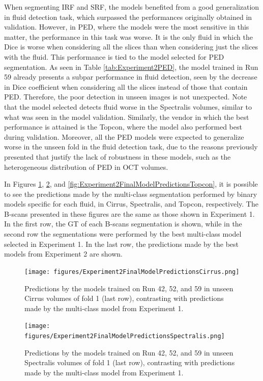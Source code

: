 When segmenting IRF and SRF, the models benefited from a good generalization in fluid detection task, which surpassed the performances originally obtained in validation. However, in PED, where the models were the most sensitive in this matter, the performance in this task was worse. It is the only fluid in which the Dice is worse when considering all the slices than when considering just the slices with the fluid. This performance is tied to the model selected for PED segmentation. As seen in Table \ref{tab:Experiment2PED}, the model trained in Run 59 already presents a subpar performance in fluid detection, seen by the decrease in Dice coefficient when considering all the slices instead of those that contain PED. Therefore, the poor detection in unseen images is not unexpected. Note that the model selected detects fluid worse in the Spectralis volumes, similar to what was seen in the model validation. Similarly, the vendor in which the best performance is attained is the Topcon, where the model also performed best during validation. Moreover, all the PED models were expected to generalize worse in the unseen fold in the fluid detection task, due to the reasons previously presented that justify the lack of robustness in these models, such as the heterogeneous distribution of PED in OCT volumes.
\par
In Figures \ref{fig:Experiment2FinalModelPredictionsCirrus}, \ref{fig:Experiment2FinalModelPredictionsSpectralis}, and \ref{fig:Experiment2FinalModelPredictionsTopcon}, it is possible to see the predictions made by the multi-class segmentation performed by binary models specific for each fluid, in Cirrus, Spectralis, and Topcon, respectively. The B-scans presented in these figures are the same as those shown in Experiment 1. In the first row, the GT of each B-scans segmentation is shown, while in the second row the segmentations were performed by the best multi-class model selected in Experiment 1. In the last row, the predictions made by the best models from Experiment 2 are shown.

\begin{figure}[!ht]
	\centering
	\texttt{[image: figures/Experiment2FinalModelPredictionsCirrus.png]}
	\caption{Predictions by the models trained on Run 42, 52, and 59 in unseen Cirrus volumes of fold 1 (last row), contrasting with predictions made by the multi-class model from Experiment 1.}
	\label{fig:Experiment2FinalModelPredictionsCirrus}
\end{figure}

\begin{figure}[!ht]
	\centering
	\texttt{[image: figures/Experiment2FinalModelPredictionsSpectralis.png]}
	\caption{Predictions by the models trained on Run 42, 52, and 59 in unseen Spectralis volumes of fold 1 (last row), contrasting with predictions made by the multi-class model from Experiment 1.}
	\label{fig:Experiment2FinalModelPredictionsSpectralis}
\end{figure}

